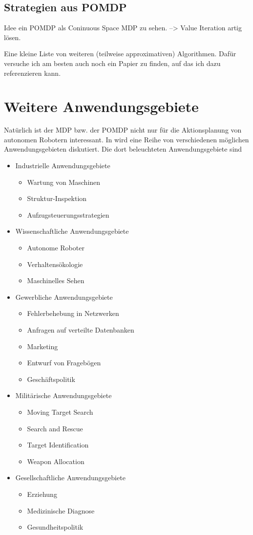 \documentclass[a4paper]{IEEEtran}
\begin{document}
\subsection{Strategien aus POMDP}
Idee ein POMDP als Coninuous Space MDP zu sehen. --> Value Iteration artig lösen.

Eine kleine Liste von weiteren (teilweise approximativen) Algorithmen. Dafür versuche ich am besten auch noch ein Papier zu finden, auf das ich dazu referenzieren kann.

\section{Weitere Anwendungsgebiete}
Natürlich ist der MDP bzw. der POMDP nicht nur für die Aktionsplanung von autonomen Robotern interessant. In \cite{cassandra1998survey} wird eine Reihe von verschiedenen möglichen Anwendungsgebieten diskutiert. Die dort beleuchteten Anwendungsgebiete sind
\begin{itemize}
	\item Industrielle Anwendungsgebiete
	\begin{itemize}
		\item Wartung von Maschinen
		\item Struktur-Inspektion
		\item Aufzugsteuerungsstrategien
	\end{itemize}
	\item Wissenschaftliche Anwendungsgebiete
	\begin{itemize}
		\item Autonome Roboter
		\item Verhaltensökologie
		\item Maschinelles Sehen
	\end{itemize}
	\item Gewerbliche Anwendungsgebiete
	\begin{itemize}
		\item Fehlerbehebung in Netzwerken
		\item Anfragen auf verteilte Datenbanken
		\item Marketing
		\item Entwurf von Fragebögen
		\item Geschäftspolitik
	\end{itemize}
	\item Militärische Anwendungsgebiete
	\begin{itemize}
		\item Moving Target Search %
		\item Search and Rescue
		\item Target Identification
		\item Weapon Allocation
	\end{itemize}
	\item Gesellschaftliche Anwendungsgebiete
	\begin{itemize}
		\item Erziehung
		\item Medizinische Diagnose
		\item Gesundheitspolitik
	\end{itemize}
\end{itemize}



\end{document}
